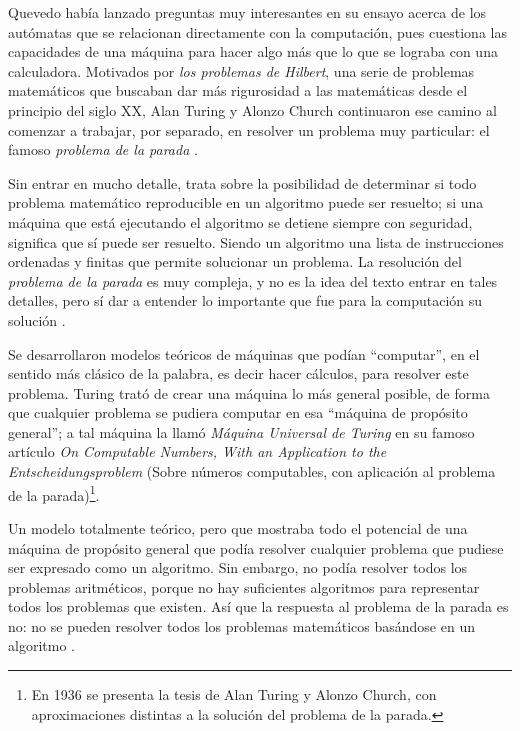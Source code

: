 \documentclass[letterpaper,12pt,oneside]{book}
\begin{document}
		Quevedo había lanzado preguntas muy interesantes en su ensayo acerca de los autómatas que se relacionan directamente con la computación, pues cuestiona
		las capacidades de una máquina para hacer algo más que lo que se lograba con una calculadora. Motivados por \textit{los problemas
		de Hilbert}, una serie de problemas matemáticos que buscaban dar más rigurosidad a las matemáticas desde el principio del siglo XX, Alan Turing
		y Alonzo Church continuaron ese camino al comenzar a trabajar, por separado, en resolver un problema muy particular: el famoso \textit{problema de la parada} \cite{ifrah_universal_2001}. 
  
        Sin entrar en mucho
		detalle, trata sobre la posibilidad de determinar si todo problema matemático reproducible en un algoritmo puede ser resuelto; si una máquina que está ejecutando el algoritmo
		se detiene siempre con seguridad,  significa que sí puede ser resuelto. Siendo un algoritmo una lista de instrucciones ordenadas y finitas que permite solucionar un 
		problema. La resolución del \textit{problema de la parada}
		es muy compleja, y no es la idea del texto entrar en tales detalles, pero sí dar a entender lo importante que fue para la computación su solución \cite{ifrah_universal_2001}.
		
		Se desarrollaron modelos teóricos de máquinas que podían ``computar'', en el sentido más clásico de la palabra, es decir hacer cálculos, para resolver este problema. Turing trató de crear
		una máquina lo más general posible, de forma que cualquier problema se pudiera computar en esa ``máquina de propósito general''; a tal máquina la llamó \textit{Máquina Universal de Turing} en su famoso artículo
		\textit{On Computable Numbers, With an Application to the
		Entscheidungsproblem} (Sobre números computables, con aplicación al problema de la parada)\footnote{En 1936 se presenta la tesis de Alan Turing y Alonzo Church, con
		aproximaciones distintas a la solución del problema de la parada.}\cite{ifrah_universal_2001}.
  
        Un modelo
		totalmente teórico, pero que mostraba todo el potencial de una máquina de propósito general que podía resolver cualquier problema que pudiese ser expresado
		como un algoritmo. Sin embargo, no podía resolver todos los problemas aritméticos, porque no hay suficientes algoritmos para representar todos los
		problemas que existen. Así que la respuesta al problema de la parada es no: no se pueden resolver todos los problemas matemáticos basándose
		en un algoritmo \cite{ifrah_universal_2001}.
  
\end{document}
